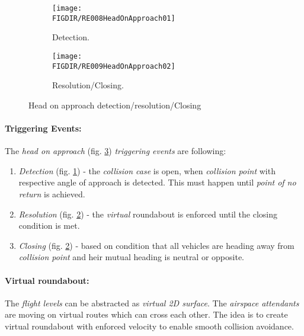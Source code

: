 \begin{figure}[H]
	\centering
    \begin{subfigure}{0.45\textwidth}
    	\centering
        \texttt{[image: \\FIGDIR/RE008HeadOnApproach01]} 
        \caption{Detection.}
        \label{fig:HeadOnApproachTheoreticalDetection}
    \end{subfigure}
    \begin{subfigure}{0.45\textwidth}
    	\centering
        \texttt{[image: \\FIGDIR/RE009HeadOnApproach02]} 
        \caption{Resolution/Closing.}
        \label{fig:HeadOnApproachTheoreticalResolution}
    \end{subfigure}
    \caption{Head on approach detection/resolution/Closing}
    \label{fig:HeadOnApproachTheoretical}
\end{figure}

\paragraph{Triggering Events:} The \emph{head on approach} (fig. \ref{fig:HeadOnApproachTheoretical}) \emph{triggering events} are following:
\begin{enumerate}
    \item \emph{Detection} (fig. \ref{fig:HeadOnApproachTheoreticalDetection}) - the \emph{collision case} is open, when \emph{collision point} with respective angle of approach is detected. This must happen until \emph{point of no return} is achieved. 
    
    \item \emph{Resolution} (fig. \ref{fig:HeadOnApproachTheoreticalResolution}) - the \emph{virtual} roundabout is enforced until the closing condition is met. 
    
    \item \emph{Closing} (fig. \ref{fig:HeadOnApproachTheoreticalResolution}) - based on condition that all vehicles are heading away from \emph{collision point} and heir mutual heading is neutral or opposite.
\end{enumerate} 

\paragraph{Virtual roundabout:} The \emph{flight levels} can be abstracted as \emph{virtual 2D surface}. The \emph{airspace attendants} are moving on virtual routes which can cross each other. The idea is to create virtual roundabout with enforced velocity to enable smooth collision avoidance.

